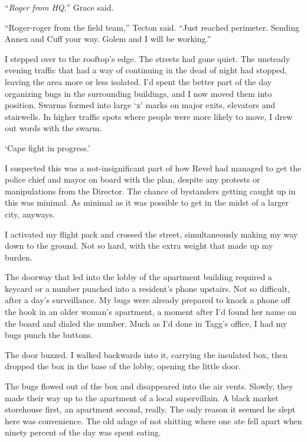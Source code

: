 ``\emph{Roger from HQ},'' Grace said.



``Roger-roger from the field team,'' Tecton said.  ``Just reached perimeter.  Sending Annex and Cuff your way.  Golem and I will be working.''



I stepped over to the rooftop's edge.  The streets had gone quiet.  The unsteady evening traffic that had a way of continuing in the dead of night had stopped, leaving the area more or less isolated.   I'd spent the better part of the day organizing bugs in the surrounding buildings, and I now moved them into position.  Swarms formed into large `x' marks on major exits, elevators and stairwells.  In higher traffic spots where people were more likely to move, I drew out words with the swarm.



`Cape fight in progress.'



I suspected this was a not-insignificant part of how Revel had managed to get the police chief and mayor on board with the plan, despite any protests or manipulations from the Director.  The chance of bystanders getting caught up in this was minimal.  As minimal as it was possible to get in the midst of a larger city, anyways.



I activated my flight pack and crossed the street, simultaneously making my way down to the ground.  Not so hard, with the extra weight that made up my burden.



The doorway that led into the lobby of the apartment building required a keycard or a number punched into a resident's phone upstairs.  Not so difficult, after a day's surveillance.  My bugs were already prepared to knock a phone off the hook in an older woman's apartment, a moment after I'd found her name on the board and dialed the number.  Much as I'd done in Tagg's office, I had my bugs punch the buttons.



The door buzzed.  I walked backwards into it, carrying the insulated box, then dropped the box in the base of the lobby, opening the little door.



The bugs flowed out of the box and disappeared into the air vents.  Slowly, they made their way up to the apartment of a local supervillain.  A black market storehouse first, an apartment second, really.  The only reason it seemed he slept here was convenience.  The old adage of not shitting where one ate fell apart when ninety percent of the day was spent eating.



